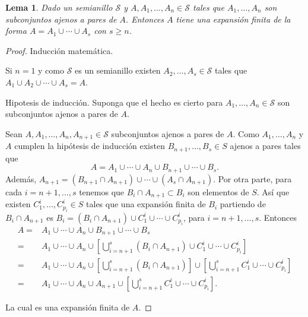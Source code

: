 \documentclass[twoside,12pt,a4 paper,openright]{book}
\newtheorem{lem}[claim]{Lema}
\begin{document}
\begin{lem}
Dado un semianillo $\mathcal S$ y $A,A_1,\dots, A_n\in \mathcal S$ tales que $A_1,\dots, A_n $ son subconjuntos ajenos a pares de $A$. Entonces $A$ tiene una expansi\'on finita de la forma 
$A=A_1\cup \cdots \cup A_s $ con $s\geq n$.
\end{lem}
\begin{proof} Inducci\'on matem\'atica. 

\noindent
Si $n=1$ y como  $\mathcal S $ es un semianillo  existen $A_2, \dots, A_s\in \mathcal S$ tales que $A_1\cup A_2\cup \cdots \cup A_s = A$.

\noindent
Hipotesis de inducci\'on. Suponga que el hecho es cierto para  $A_1,\dots, A_n \in\mathcal S$ son subconjuntos ajenos a pares de $A$.

\noindent
Sean $A,A_1,\dots, A_n, A_{n+1}\in \mathcal S$  subconjuntos ajenos a pares de $A$. Como   $A_1,\dots, A_n $ y $A$ cumplen la hip\'otesis de inducci\'on   existen $B_{n+1},\dots ,B_s \in S$ ajenos a pares tales que  
$$A=A_1\cup \cdots \cup A_n \cup B_{n+1} \cup \cdots \cup B_s.$$ 
\noindent
Adem\'as,  $A_{n+1} = (B_{n+1}\cap A_{n+1}) \cup \cdots \cup (A_s \cap A_{n+1})$. 
\noindent
Por otra parte,  para cada   $i=n+1, \dots, s$ tenemos que    $B_{i} \cap A_{n+1} \subset B_i $ son elementos de $S$. As\'i que  existen $C^i_{1},\dots, C^i_{p_i} \in S$ tales que 
una expansi\'on finita de  $B_i $ partiendo de $B_{i} \cap A_{n+1}$ es
 $B_i=  (B_{i} \cap A_{n+1}) \cup C^i_{1}\cup \cdots \cup  C^i_{p_i} $,
  para $i=n+1,\dots, s$.  Entonces 
\begin{align*} 
A= & A_1\cup \cdots \cup A_n \cup B_{n+1} \cup \cdots \cup B_s\\ 
  = & A_1\cup \cdots \cup A_n  \cup \left[ \bigcup_{i=n+1}^s  (B_{i} \cap A_{n+1}) \cup C^i_{1}\cup \cdots \cup  C^i_{p_i} \right]  \\
   = & A_1\cup \cdots \cup A_n  \cup \left[ \bigcup_{i=n+1}^s  (B_{i} \cap A_{n+1}) \right] \cup  \left[ \bigcup_{i=n+1}^s  C^i_{1}\cup \cdots \cup  C^i_{p_i} \right]  \\
      = & A_1\cup \cdots \cup A_n  \cup  A_{n+1}  \cup  \left[ \bigcup_{i=n+1}^s  C^i_{1}\cup \cdots \cup  C^i_{p_i} \right]. 
  \end{align*} 

La cual es una expansi\'on finita de  $A$. 

\end{proof}


 
\end{document}
